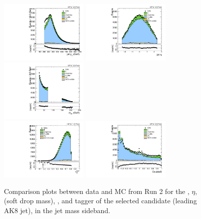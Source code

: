 \begin{figure}[htbp]
  \centering
  \includegraphics[width=0.3825\textwidth]{fig/analysisAppendix/SB_b1_allL_allP_allC_allD_Run2_lnujj_l2_pt.pdf}
  \includegraphics[width=0.3825\textwidth]{fig/analysisAppendix/SB_b1_allL_allP_allC_allD_Run2_lnujj_l2_eta.pdf}\\
  \includegraphics[width=0.3825\textwidth]{fig/analysisAppendix/SB_b1_allL_allP_allC_allD_Run2_mjet.pdf}\\
  \includegraphics[width=0.3825\textwidth]{fig/analysisAppendix/SB_b1_allL_allP_allC_allD_Run2_tau21DDT.pdf}
  \includegraphics[width=0.3825\textwidth]{fig/analysisAppendix/SB_b1_allL_allP_allC_allD_Run2_DoubleB.pdf}\\
  \caption{
    Comparison plots between data and MC from Run 2 for the \pt, $\eta$, \MJ (soft drop mass), \nsubjDDT, and \DoubleB tagger of the selected \Vhad candidate (leading AK8 jet), in the jet mass sideband.
  }
  \label{fig:SB_controlPlotsRun2_3}
\end{figure}


